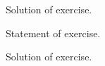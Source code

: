 \documentclass[11pt, twoside, reqno]{article}
\begin{document}

\startmain


\demo
Solution of exercise.
\edemo


Statement of exercise.
\eexero

\demo
Solution of exercise.
\edemo
\end{document}
